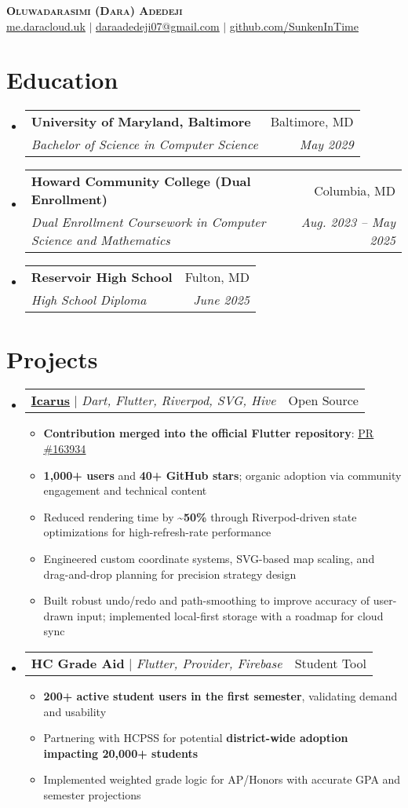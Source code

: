 \documentclass[letterpaper,11pt]{article}
\makeatletter
\newcommand{\resumeItem}[1]{
  \item\small{
    {#1 \vspace{-2pt}}
  }
}
\newcommand{\resumeSubheading}[4]{
  \vspace{-2pt}\item
    \begin{tabular*}{0.97\textwidth}[t]{l@{\extracolsep{\fill}}r}
      \textbf{#1} & #2 \\
      \textit{\small#3} & \textit{\small #4} \\
    \end{tabular*}\vspace{-7pt}
}
\newcommand{\resumeProjectHeading}[2]{
    \item
    \begin{tabular*}{0.97\textwidth}{l@{\extracolsep{\fill}}r}
      \small#1 & #2 \\
    \end{tabular*}\vspace{-7pt}
}
\newcommand{\resumeSubHeadingListStart}{\begin{itemize}[leftmargin=0.15in, label={}]}
\newcommand{\resumeSubHeadingListEnd}{\end{itemize}}
\newcommand{\resumeItemListStart}{\begin{itemize}}
\newcommand{\resumeItemListEnd}{\end{itemize}\vspace{-5pt}}
\makeatother
\begin{document}
\begin{center}
    \textbf{\Huge \scshape Oluwadarasimi (Dara) Adedeji} \\ \vspace{1pt}
    \small \href{https://me.daracloud.uk}{\underline{me.daracloud.uk}} $|$ \href{mailto:daraadedeji07@gmail.com}{\underline{daraadedeji07@gmail.com}} $|$ 
    \href{https://github.com/SunkenInTime}{\underline{github.com/SunkenInTime}}
\end{center}

\section{Education}
  \resumeSubHeadingListStart
    \resumeSubheading
      {University of Maryland, Baltimore}{Baltimore, MD}
      {Bachelor of Science in Computer Science}{May 2029}
    \resumeSubheading
      {Howard Community College (Dual Enrollment)}{Columbia, MD}
      {Dual Enrollment Coursework in Computer Science and Mathematics}{Aug. 2023 -- May 2025}
    \resumeSubheading
      {Reservoir High School}{Fulton, MD}
      {High School Diploma}{June 2025}
  \resumeSubHeadingListEnd

\section{Projects}
  \resumeSubHeadingListStart
    \resumeProjectHeading
      {\textbf{\href{https://github.com/SunkenInTime/icarus}{\underline{Icarus}}} $|$ \emph{Dart, Flutter, Riverpod, SVG, Hive}}{Open Source}
      \resumeItemListStart
        \resumeItem{\textbf{Contribution merged into the official Flutter repository}: \href{https://github.com/flutter/flutter/pull/163934}{\underline{PR \#163934}}}
        \resumeItem{\textbf{1,000+ users} and \textbf{40+ GitHub stars}; organic adoption via community engagement and technical content}
        \resumeItem{Reduced rendering time by \textbf{\textasciitilde50\%} through Riverpod-driven state optimizations for high-refresh-rate performance}
        \resumeItem{Engineered custom coordinate systems, SVG-based map scaling, and drag-and-drop planning for precision strategy design}
        \resumeItem{Built robust undo/redo and path-smoothing to improve accuracy of user-drawn input; implemented local-first storage with a roadmap for cloud sync}
      \resumeItemListEnd

    \resumeProjectHeading
      {\textbf{HC Grade Aid} $|$ \emph{Flutter, Provider, Firebase}}{Student Tool}
      \resumeItemListStart
        \resumeItem{\textbf{200+ active student users in the first semester}, validating demand and usability}
        \resumeItem{Partnering with HCPSS for potential \textbf{district-wide adoption impacting 20,000+ students}}
        \resumeItem{Implemented weighted grade logic for AP/Honors with accurate GPA and semester projections}
      \resumeItemListEnd
  \resumeSubHeadingListEnd
\end{document}
